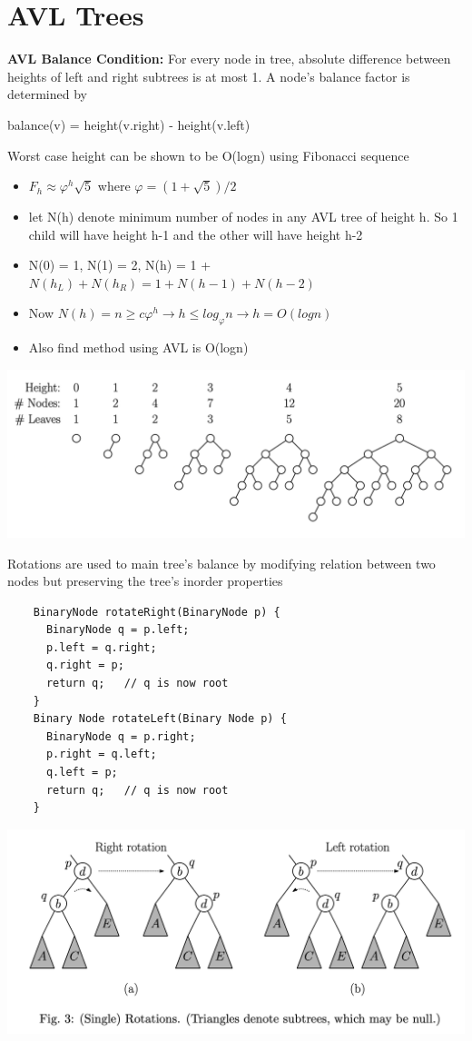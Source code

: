 \documentclass{article}
\begin{document}
  \section{AVL Trees}
  \textbf{AVL Balance Condition: }For every node in tree, absolute difference between heights of left and right subtrees is at most 1. A node's balance factor is determined by
  \begin{center}
    balance(v) = height(v.right) - height(v.left)
  \end{center}
  Worst case height can be shown to be O(logn) using Fibonacci sequence
  \begin{itemize}[noitemsep]
  \item $F_{h} \approx \varphi^{h}\sqrt{5}$ where $\varphi = (1 + \sqrt{5})/2$ 
  \item let N(h) denote minimum number of nodes in any AVL tree of height h. So 1 child will have height h-1 and the other will have height h-2
  \item N(0) = 1, N(1) = 2, N(h) = 1 + $N(h_{L}) + N(h_{R}) = 1 + N(h-1) + N(h-2)$
  \item Now $N(h) = n \geq c \varphi^{h} \rightarrow h \leq log_{\varphi}n \rightarrow h = O(logn)$
  \item Also find method using AVL is O(logn)
  \end{itemize}
  \begin{center}
  \includegraphics[scale=0.3]{FibTreeMinNodes}
  \end{center}
  Rotations are used to main tree's balance by modifying relation between two nodes but preserving the tree's inorder properties 
  \begin{lstlisting}
    BinaryNode rotateRight(BinaryNode p) {
      BinaryNode q = p.left;
      p.left = q.right;
      q.right = p;
      return q;   // q is now root
    }
    Binary Node rotateLeft(Binary Node p) {
      BinaryNode q = p.right;
      p.right = q.left;
      q.left = p;
      return q;   // q is now root
    }
  \end{lstlisting}
  \begin{center}
  \includegraphics[scale=0.15]{FibTreeRotation}
  \end{center}
\end{document}
